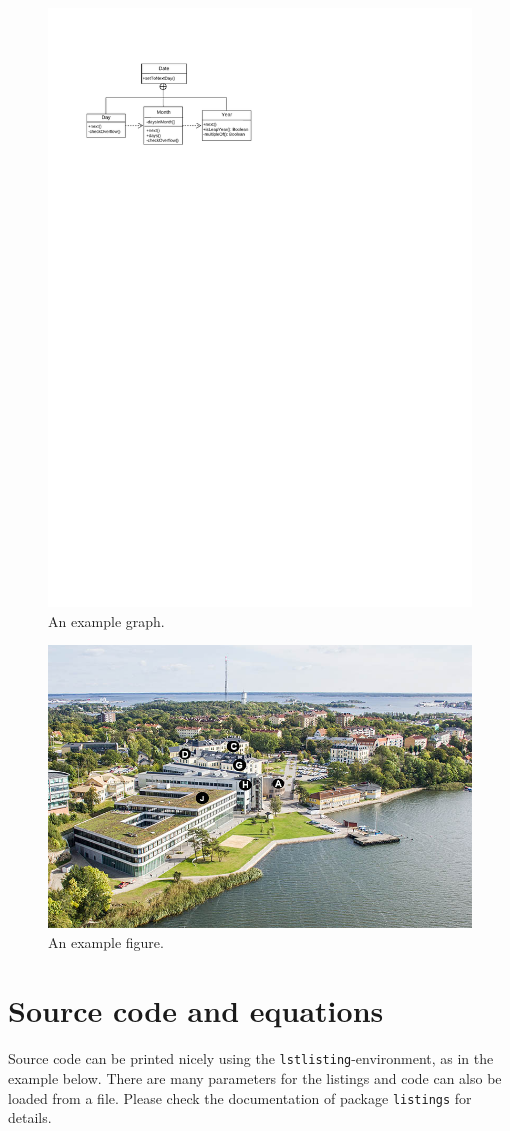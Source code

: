 \documentclass[12pt,a4paper]{article}
\begin{document}
\begin{figure}[bth]
\centering
\includegraphics[width=0.6\columnwidth]{example-graph}
\caption{An example graph.}
\label{fig:uml}
\end{figure}

\begin{figure}[bth]
\centering
\includegraphics[width=0.6\columnwidth]{example-fig}
\caption{An example figure.}
\label{fig:bth}
\end{figure}


\section{Source code and equations}
\label{sec:code}
Source code can be printed nicely using the \texttt{lstlisting}-environment, as in the example below. There are many parameters for the listings and code can also be loaded from a file. Please check the documentation of package \texttt{listings} for details.
\end{document}
